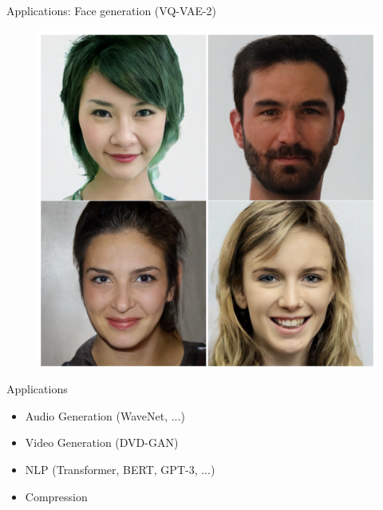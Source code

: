 \begin{frame}{Applications: Face generation (VQ-VAE-2)}
    \begin{figure}
        \centering
        \includegraphics[width=0.65\linewidth]{figs/vq_vae.png}
        \label{fig:vq_vae}
    \end{figure}
\end{frame}
\begin{frame}{Applications}
\begin{itemize}
    \item Audio Generation (WaveNet, ...)
    \item Video Generation (DVD-GAN)
    \item NLP (Transformer, BERT, GPT-3, ...)
    \item Compression
\end{itemize}
\end{frame}
